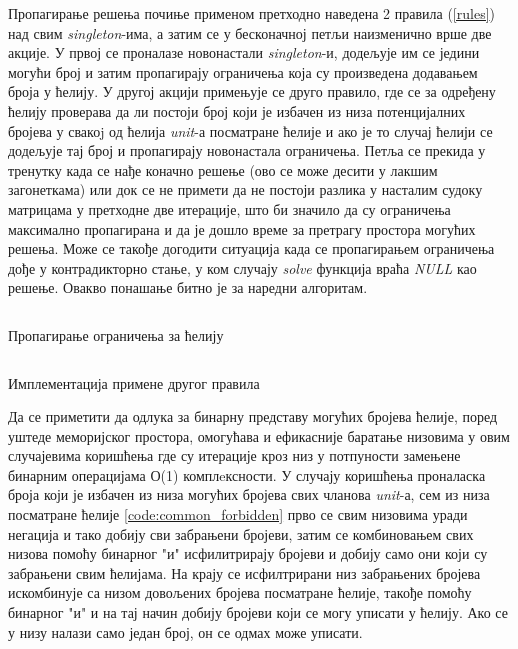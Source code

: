 Пропагирање решења почиње применом претходно наведена 2 правила (\ref{rules}) над свим \textit{singleton}-има, а затим се у бесконачној петљи наизменично врше две акције. У првој се проналазе новонастали \textit{singleton}-и, додељује им се једини могући број и затим пропагирају ограничења која су произведена додавањем броја у ћелију. У другој акцији примењује се друго правило, где се за одређену ћелију проверава да ли постоји број који је избачен из низа потенцијалних бројева у свакоj од ћелија \textit{unit}-а посматране ћелије и ако је то случај ћелији се додељује тај број и пропагирају новонастала ограничења. Петља се прекида у тренутку када се нађе коначно решење (ово се може десити у лакшим загонеткама) или док се не примети да не постоји разлика у насталим судоку матрицама у претходне две итерације, што би значило да су ограничења максимално пропагирана и да је дошло време за претрагу простора могућих решења. Може се такође догодити ситуација када се пропагирањем ограничења дође у контрадикторно стање, у ком случају \textit{solve} функција враћа \textit{NULL} као решење. Овакво понашање битно је за наредни алгоритам.

\begin{listing}[H]
\inputminted{c}{kodovi/rules_propagation.c}
\caption{Пропагирање ограничења за ћелију}
\label{code:rules_propagation}
\end{listing}

\begin{listing}[H]
\inputminted{c}{kodovi/common_forbidden.c}
\caption{Имплементација примене другог правила}
\label{code:common_forbidden}
\end{listing}

Да се приметити да одлука за бинарну представу могућих бројева ћелије, поред уштеде меморијског простора, омогућава и ефикасније баратање низовима у овим случајевима коришћења где су итерације кроз низ у потпуности замењене бинарним операцијама О(1) комплeксности. У случају коришћења проналаска броја који је избачен из низа могућих бројева свих чланова \textit{unit}-а, сем из низа посматране ћелије \ref{code:common_forbidden} прво се свим низовима уради негација и тако добију сви забрањени бројеви, затим се комбиновањем свих низова помоћу бинарног "и" исфилитрирају бројеви и добију само они који су забрањени свим ћелијама. На крају се исфилтрирани низ забрањених бројева искомбинује са низом довољених бројева посматране ћелије, такође помоћу бинарног "и" и на тај начин добију бројеви који се могу уписати у ћелију. Ако се у низу налази само један број, он се одмах може уписати.

